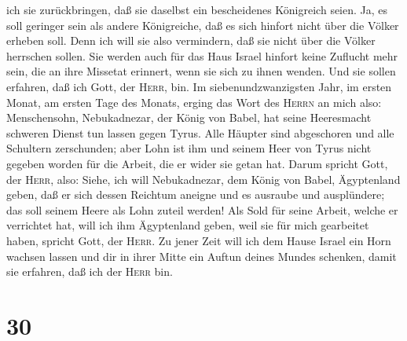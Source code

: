 ich sie zurückbringen, daß sie daselbst ein bescheidenes Königreich
seien.  Ja, es soll geringer sein als andere Königreiche,
daß es sich hinfort nicht über die Völker erheben soll. Denn ich will
sie also vermindern, daß sie nicht über die Völker herrschen sollen.
 Sie werden auch für das Haus Israel hinfort keine
Zuflucht mehr sein, die an ihre Missetat erinnert, wenn sie sich zu
ihnen wenden. Und sie sollen erfahren, daß ich Gott, der \textsc{Herr},
bin.  Im siebenundzwanzigsten Jahr, im ersten Monat, am
ersten Tage des Monats, erging das Wort des \textsc{Herrn} an mich also:
 Menschensohn, Nebukadnezar, der König von Babel, hat
seine Heeresmacht schweren Dienst tun lassen gegen Tyrus. Alle Häupter
sind abgeschoren und alle Schultern zerschunden; aber Lohn ist ihm und
seinem Heer von Tyrus nicht gegeben worden für die Arbeit, die er wider
sie getan hat.  Darum spricht Gott, der \textsc{Herr},
also: Siehe, ich will Nebukadnezar, dem König von Babel, Ägyptenland
geben, daß er sich dessen Reichtum aneigne und es ausraube und
ausplündere; das soll seinem Heere als Lohn zuteil werden!
 Als Sold für seine Arbeit, welche er verrichtet hat,
will ich ihm Ägyptenland geben, weil sie für mich gearbeitet haben,
spricht Gott, der \textsc{Herr}.  Zu jener Zeit will ich
dem Hause Israel ein Horn wachsen lassen und dir in ihrer Mitte ein
Auftun deines Mundes schenken, damit sie erfahren, daß ich der
\textsc{Herr} bin.

\hypertarget{section-29}{%
\section{30}\label{section-29}}


